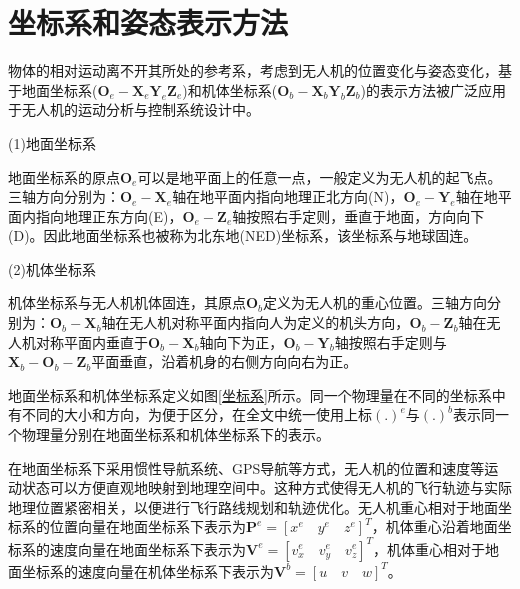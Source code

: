 \section{坐标系和姿态表示方法}

物体的相对运动离不开其所处的参考系，考虑到无人机的位置变化与姿态变化，基于地面坐标系($\boldsymbol{O}_e-\boldsymbol{X}_e\boldsymbol{Y}_e\boldsymbol{Z}_e $)和机体坐标系(${\boldsymbol{O}_b}-{\boldsymbol{X}_b}{\boldsymbol{Y}_b}{\boldsymbol{Z}_b}$)的表示方法被广泛应用于无人机的运动分析与控制系统设计中。

(1)地面坐标系

地面坐标系的原点$\boldsymbol{O}_e$可以是地平面上的任意一点，一般定义为无人机的起飞点。三轴方向分别为：$\boldsymbol{O}_e-\boldsymbol{X}_e$轴在地平面内指向地理正北方向(N)，$\boldsymbol{O}_e-\boldsymbol{Y}_e$轴在地平面内指向地理正东方向(E)，$\boldsymbol{O}_e-\boldsymbol{Z}_e$轴按照右手定则，垂直于地面，方向向下(D)。因此地面坐标系也被称为北东地(NED)坐标系，该坐标系与地球固连。

(2)机体坐标系

机体坐标系与无人机机体固连，其原点$\boldsymbol{O}_b$定义为无人机的重心位置。三轴方向分别为：$\boldsymbol{O}_b-\boldsymbol{X}_b$轴在无人机对称平面内指向人为定义的机头方向，$\boldsymbol{O}_b-\boldsymbol{Z}_b$轴在无人机对称平面内垂直于$\boldsymbol{O}_b-\boldsymbol{X}_b$轴向下为正，$\boldsymbol{O}_b-\boldsymbol{Y}_b$轴按照右手定则与$\boldsymbol{X}_b-\boldsymbol{O}_b-\boldsymbol{Z}_b$平面垂直，沿着机身的右侧方向向右为正。

地面坐标系和机体坐标系定义如图\ref{坐标系}所示。同一个物理量在不同的坐标系中有不同的大小和方向，为便于区分，在全文中统一使用上标$(.)^{e}$与$(.)^{b}$表示同一个物理量分别在地面坐标系和机体坐标系下的表示。

在地面坐标系下采用惯性导航系统、GPS导航等方式，无人机的位置和速度等运动状态可以方便直观地映射到地理空间中。这种方式使得无人机的飞行轨迹与实际地理位置紧密相关，以便进行飞行路线规划和轨迹优化。无人机重心相对于地面坐标系的位置向量在地面坐标系下表示为$\boldsymbol{P}^{e}=[{x}^{e} \quad {y}^{e} \quad {z}^{e}]^{T}$，机体重心沿着地面坐标系的速度向量在地面坐标系下表示为$\boldsymbol{V}^{e}=[{v}^{e}_{x} \quad {v}^{e}_{y} \quad {v}^{e}_{z}]^{T}$，机体重心相对于地面坐标系的速度向量在机体坐标系下表示为$\boldsymbol{V}^{b}=[{u} \quad {v} \quad {w}]^{T}$。

